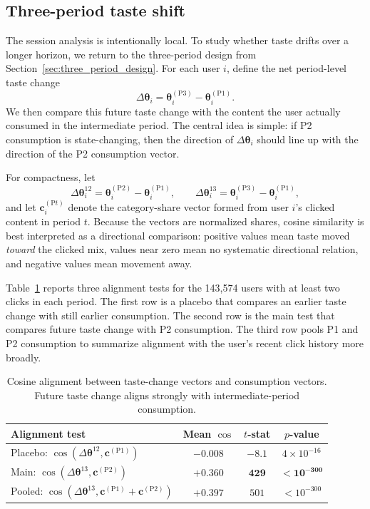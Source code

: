\documentclass[11pt]{article}
\begin{document}
\subsection{Three-period taste shift}
\label{sec:three_period}

The session analysis is intentionally local. To study whether taste drifts over a longer horizon, we return to the three-period design from Section~\ref{sec:three_period_design}. For each user $i$, define the net period-level taste change
\[
\Delta\boldsymbol{\theta}_i
=
\boldsymbol{\theta}_i^{(\mathrm{P3})}
-
\boldsymbol{\theta}_i^{(\mathrm{P1})}.
\]
We then compare this future taste change with the content the user actually consumed in the intermediate period. The central idea is simple: if P2 consumption is state-changing, then the direction of $\Delta\boldsymbol{\theta}_i$ should line up with the direction of the P2 consumption vector.

For compactness, let
\[
\Delta\boldsymbol{\theta}_i^{12}
=
\boldsymbol{\theta}_i^{(\mathrm{P2})}
-
\boldsymbol{\theta}_i^{(\mathrm{P1})},
\qquad
\Delta\boldsymbol{\theta}_i^{13}
=
\boldsymbol{\theta}_i^{(\mathrm{P3})}
-
\boldsymbol{\theta}_i^{(\mathrm{P1})},
\]
and let $\mathbf{c}_i^{(\mathrm{P}t)}$ denote the category-share vector formed from user $i$'s clicked content in period $t$. Because the vectors are normalized shares, cosine similarity is best interpreted as a directional comparison: positive values mean taste moved \emph{toward} the clicked mix, values near zero mean no systematic directional relation, and negative values mean movement away.

Table~\ref{tab:taste_alignment} reports three alignment tests for the 143,574 users with at least two clicks in each period. The first row is a placebo that compares an earlier taste change with still earlier consumption. The second row is the main test that compares future taste change with P2 consumption. The third row pools P1 and P2 consumption to summarize alignment with the user's recent click history more broadly.

\begin{table}[ht]
\centering
\caption{Cosine alignment between taste-change vectors and consumption vectors. Future taste change aligns strongly with intermediate-period consumption.}
\label{tab:taste_alignment}
\begin{tabular}{lccc}
\toprule
Alignment test & Mean $\cos$ & $t$-stat & $p$-value \\
\midrule
Placebo: $\cos(\Delta\boldsymbol{\theta}^{12}, \mathbf{c}^{(\mathrm{P1})})$ & $-0.008$ & $-8.1$ & $4 \times 10^{-16}$ \\
Main: $\cos(\Delta\boldsymbol{\theta}^{13}, \mathbf{c}^{(\mathrm{P2})})$ & $\boldsymbol{+0.360}$ & $\boldsymbol{429}$ & $\boldsymbol{< 10^{-300}}$ \\
Pooled: $\cos(\Delta\boldsymbol{\theta}^{13}, \mathbf{c}^{(\mathrm{P1})}{+}\mathbf{c}^{(\mathrm{P2})})$ & $+0.397$ & $501$ & $< 10^{-300}$ \\
\bottomrule
\end{tabular}
\end{table}
\FloatBarrier
\end{document}
